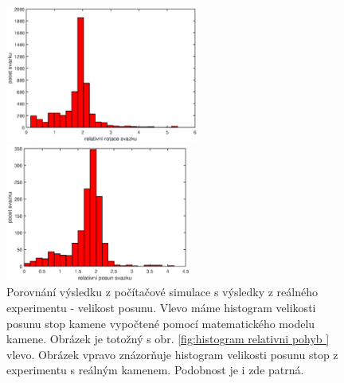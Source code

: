 \begin{figure}[h!]
 \begin{center}
 

   \begin{minipage}[c]{0.45\textwidth}
     \centering \includegraphics[height =4.5cm]{figures/relative} 
   \end{minipage}
   \begin{minipage}[c]{0.45\textwidth}
     \centering \includegraphics[height =4.5cm]{figures/real_relative} 
   \end{minipage}
 \end{center}

   \caption{Porovnání výsledku z počítačové simulace s výsledky z reálného experimentu - velikost posunu. Vlevo máme histogram velikosti posunu stop kamene  vypočtené pomocí matematického modelu kamene. Obrázek je totožný s obr. \ref{fig:histogram relativni pohyb } vlevo. Obrázek vpravo znázorňuje histogram velikosti posunu stop z experimentu s reálným kamenem. Podobnost je i zde patrná.}
  \label{fig:relativni posun porovnani}
 \end{figure}